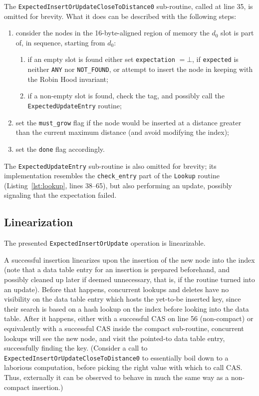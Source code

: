 The \texttt{ExpectedInsertOrUpdateCloseToDistance0} sub-routine, called at line 35, is omitted for brevity.
What it does can be described with the following steps:
\begin{enumerate}
    \item consider the nodes in the 16-byte-aligned region of memory the $d_0$ slot is part of, in sequence, starting from $d_0$:
    \begin{enumerate}
        \item if an empty slot is found either set \texttt{expectation} $=\bot$, if \texttt{expected} is neither \texttt{ANY} nor \texttt{{NOT\_FOUND}}, or attempt to insert the node in keeping with the Robin Hood invariant;
        \item if a non-empty slot is found, check the tag, and possibly call the \texttt{ExpectedUpdateEntry} routine;
    \end{enumerate}
    \item set the \texttt{{must\_grow}} flag if the node would be inserted at a distance greater than the current maximum distance (and avoid modifying the index);
    \item set the \texttt{done} flag accordingly.
\end{enumerate}

The \texttt{ExpectedUpdateEntry} sub-routine is also omitted for brevity; its implementation resembles the \texttt{{check\_entry}} part of the \texttt{Lookup} routine (Listing~\ref{lst:lookup}, lines 38--65), but also performing an update, possibly signaling that the expectation failed.




\subsection{Linearization}\label{subsec:insert-linearization}

The presented \texttt{ExpectedInsertOrUpdate} operation is linearizable.

A successful insertion linearizes upon the insertion of the new node into the index (note that a data table entry for an insertion is prepared beforehand, and possibly cleaned up later if deemed unnecessary, that is, if the routine turned into an update).
Before that happens, concurrent lookups and deletes have no visibility on the data table entry which hosts the yet-to-be inserted key, since their search is based on a hash lookup on the index before looking into the data table.
After it happens, either with a successful CAS on line 56 (non-compact) or equivalently with a successful CAS inside the compact sub-routine, concurrent lookups will see the new node, and visit the pointed-to data table entry, successfully finding the key.
(Consider a call to \texttt{ExpectedInsertOrUpdateCloseToDistance0} to essentially boil down to a laborious computation, before picking the right value with which to call CAS\@.
Thus, externally it can be observed to behave in much the same way as a non-compact insertion.)

